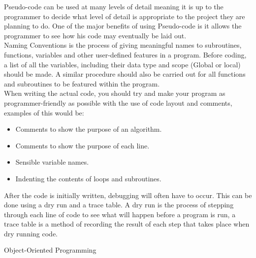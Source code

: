   Pseudo-code can be used at many levels of detail meaning it is up to the programmer to decide what level of detail is appropriate to the project they are planning to do. One of the major benefits of using Pseudo-code is it allows the programmer to see how his code may eventually be laid out.\\
  Naming Conventions is the process of giving meaningful names to subroutines, functions, variables and other user-defined features in a program. Before coding, a list of all the variables, including their data type and scope (Global or local) should be made. A similar procedure should also be carried out for all functions and subroutines to be featured within the program.\\
  When writing the actual code, you should try and make your program as programmer-friendly  as possible with the use of code layout and comments, examples of this would be:
  \begin{itemize}
    \setlength\itemsep{0cm}
    \item Comments to show the purpose of an algorithm.
    \item Comments to show the purpose of each line.
    \item Sensible variable names.
    \item Indenting the contents of loops and subroutines.
  \end{itemize}
  After the code is initially written, debugging will often have to occur. This can be done using a dry run and a trace table. A dry run is the process of stepping through each line of code to see what will happen before a program is run, a trace table is a method of recording the result of each step that takes place when dry running code.
  
  \noindent
  Object-Oriented Programming
